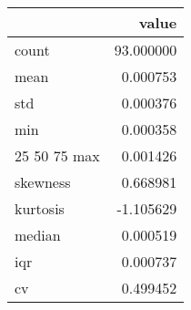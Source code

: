 \begin{tabular}{lr}
\toprule
 & value \\
\midrule
count & 93.000000 \\
mean & 0.000753 \\
std & 0.000376 \\
min & 0.000358 \\
25%
50%
75%
max & 0.001426 \\
skewness & 0.668981 \\
kurtosis & -1.105629 \\
median & 0.000519 \\
iqr & 0.000737 \\
cv & 0.499452 \\
\bottomrule
\end{tabular}
